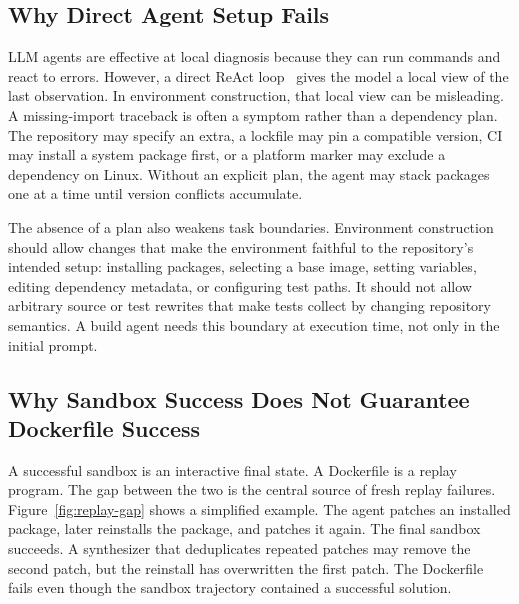 \subsection{Why Direct Agent Setup Fails}

LLM agents are effective at local diagnosis because they can run commands and react to errors.
However, a direct ReAct loop~\cite{yao2023react} gives the model a local view of the last observation.
In environment construction, that local view can be misleading.
A missing-import traceback is often a symptom rather than a dependency plan.
The repository may specify an extra, a lockfile may pin a compatible version, CI may install a system package first, or a platform marker may exclude a dependency on Linux.
Without an explicit plan, the agent may stack packages one at a time until version conflicts accumulate.

The absence of a plan also weakens task boundaries.
Environment construction should allow changes that make the environment faithful to the repository's intended setup: installing packages, selecting a base image, setting variables, editing dependency metadata, or configuring test paths.
It should not allow arbitrary source or test rewrites that make tests collect by changing repository semantics.
A build agent needs this boundary at execution time, not only in the initial prompt.

\subsection{Why Sandbox Success Does Not Guarantee Dockerfile Success}

A successful sandbox is an interactive final state.
A Dockerfile is a replay program.
The gap between the two is the central source of fresh replay failures.
Figure~\ref{fig:replay-gap} shows a simplified example.
The agent patches an installed package, later reinstalls the package, and patches it again.
The final sandbox succeeds.
A synthesizer that deduplicates repeated patches may remove the second patch, but the reinstall has overwritten the first patch.
The Dockerfile fails even though the sandbox trajectory contained a successful solution.

